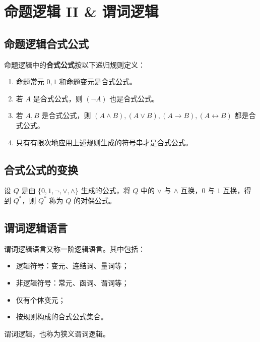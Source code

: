 \section{命题逻辑 II \& 谓词逻辑}

\subsection{命题逻辑合式公式}

\begin{definition}[命题逻辑合式公式]
    命题逻辑中的\textbf{合式公式}按以下递归规则定义：
    \begin{enumerate}
        \item 命题常元 $0, 1$ 和命题变元是合式公式。
        \item 若 $A$ 是合式公式，则 $(\lnot A)$ 也是合式公式。
        \item 若 $A, B$ 是合式公式，则 $(A \land B), (A \lor B), (A \to B), (A \leftrightarrow B)$ 都是合式公式。
        \item 只有有限次地应用上述规则生成的符号串才是合式公式。
    \end{enumerate}
\end{definition}

\subsection{合式公式的变换}

\begin{definition}[对偶]
    设 $Q$ 是由 $\{0, 1, \lnot, \lor, \land\}$ 生成的公式，将 $Q$ 中的 $\lor$ 与 $\land$ 互换，$0$ 与 $1$ 互换，得到 $Q^*$，则 $Q^*$ 称为 $Q$ 的对偶公式。
\end{definition}

\subsection{谓词逻辑语言}

谓词逻辑语言又称一阶逻辑语言。其中包括：
\begin{itemize}
    \item 逻辑符号：变元、连结词、量词等；
    \item 非逻辑符号：常元、函词、谓词等；
    \item 仅有个体变元；
    \item 按规则构成的合式公式集合。
\end{itemize}

谓词逻辑，也称为狭义谓词逻辑。


